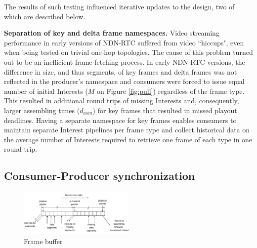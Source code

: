 \documentclass{icn/sig-alternate-2013} %
\newcommand{\ndnrtcName}{NDN-RTC} %
\begin{document}
The results of such testing influenced iterative updates to the design, two of which are described below. 

\textbf{Separation of key and delta frame namespaces.} Video streaming performance in early versions of \ndnrtcName{} suffered from video ``hiccups", even when being tested on trivial one-hop topologies. The cause of this problem turned out to be an inefficient frame fetching process.
 In early \ndnrtcName{} versions, the difference in size, and thus segments, of key frames and delta frames was not reflected in the producer's namespace and consumers were forced to issue equal number of initial Interests ($M$ on Figure \ref{fig:pull}) regardless of the frame type. This resulted in additional round trips of missing Interests and, consequently, larger assembling times ($d_{asm}$) for key frames that resulted in missed playout deadlines. Having a separate namespace for key frames enables consumers to maintain separate Interest pipelines per frame type and collect historical data on the average number of Interests required to retrieve one frame of each type in one round trip. 




\subsection{Consumer-Producer synchronization}

\begin{figure}[t!]
\centering
\includegraphics[width=0.5\textwidth]{buffer}
\caption{Frame buffer}
\label{fig:old-buf}
\end{figure}
\end{document}
